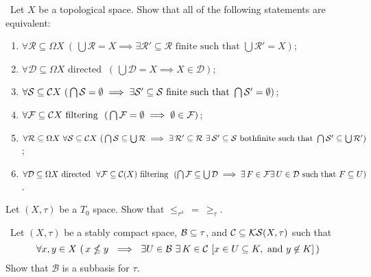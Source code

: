 \begin{exercise}\label{exer:covers} \
Let $X$ be a topological space. Show that all of the following statements are equivalent:
\begin{enumerate}[label=(\roman*)]
\item $\forall\mathcal R\subseteq \Omega X\ (\,\bigcup\mathcal R=X\implies \exists\mathcal R'\subseteq\mathcal R\text{ finite such that }\bigcup\mathcal R'=X)$;\\[-2ex]

\item $\forall\mathcal D\subseteq\Omega X\text{ directed }\ (\,\bigcup\mathcal D=X\implies X\in\mathcal D)$;\\[-2ex]

\item $\forall\mathcal S\subseteq\cC X\ (\,\bigcap\mathcal S=\emptyset\implies \exists\mathcal S'\subseteq\mathcal S\text{ finite such that }\bigcap\mathcal S'=\emptyset)$;\\[-2ex]
\item $\forall\mathcal F\subseteq\mathcal{C} X\text{ filtering }\ (\,\bigcap\mathcal F=\emptyset\implies \emptyset\in\mathcal F)$;\\[-2ex]

\item $\forall\mathcal R\subseteq\Omega X\ \forall\mathcal S\subseteq\cC X
\ (\,\bigcap\mathcal S\subseteq\bigcup\mathcal R\implies \exists\,\mathcal R'\subseteq\mathcal R
\ \exists\,\mathcal S'\subseteq\mathcal S\text{ both}\\
\text{finite such that }\bigcap\mathcal S'\subseteq\bigcup\mathcal R')$;\\[-2ex]

\item $\forall\mathcal D\subseteq\Omega X\text{ directed }\
\forall\mathcal F\subseteq\mathcal{C}(X)\text{ filtering }\
(\bigcap\mathcal F\subseteq\bigcup\mathcal D\implies \exists\, F\in\mathcal F\\
\exists\, U\in\mathcal D\text{ such that }F\subseteq U)$.
\end{enumerate}
\end{exercise}

\begin{exercise}\label{exer:}
Let $(X,\tau)$ be a $T_0$ space. Show that $\leq_{\tau^\partial}\ =\ \geq_\tau$.
\end{exercise}

\begin{exercise}\label{exer:SCSsubbasis} \
Let $(X,\tau)$ be a stably compact space, $\mathcal{B}\subseteq\tau$, and $\mathcal{C}\subseteq\mathcal{KS}(X,\tau)$ such that
\[
\forall x,y\in X\ (\,x\nleq y\ \implies \ \exists U\in\mathcal{B}\ \exists\,K\in\mathcal{C}\ [x\in U\subseteq K, \text{ and }
y\not\in K]\,)
\]
Show that $\mathcal B$ is a subbasis for $\tau$.
\end{exercise}

